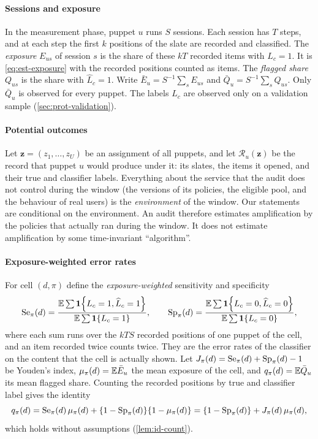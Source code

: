 \paragraph{Sessions and exposure}
In the measurement phase, puppet $u$ runs $S$ sessions. Each session has $T$ steps, and at each step the first $k$ positions of the slate are recorded and classified. The \emph{exposure} $E_{us}$ of session $s$ is the share of these $kT$ recorded items with $L_c=1$. It is \eqref{eq:est-exposure} with the recorded positions counted as items. The \emph{flagged share} $Q_{us}$ is the share with $\widehat L_c=1$. Write $\bar E_u=S^{-1}\sum_sE_{us}$ and $\bar Q_u=S^{-1}\sum_sQ_{us}$. Only $\bar Q_u$ is observed for every puppet. The labels $L_c$ are observed only on a validation sample (\cref{sec:prot-validation}).

\paragraph{Potential outcomes}
Let $\bm z=(z_1,\dots,z_U)$ be an assignment of all puppets, and let $\mathcal R_u(\bm z)$ be the record that puppet $u$ would produce under it: its slates, the items it opened, and their true and classifier labels. Everything about the service that the audit does not control during the window (the versions of its policies, the eligible pool, and the behaviour of real users) is the \emph{environment} of the window. Our statements are conditional on the environment. An audit therefore estimates amplification by the policies that actually ran during the window. It does not estimate amplification by some time-invariant ``algorithm''.

\paragraph{Exposure-weighted error rates}
For cell $(d,\pi)$ define the \emph{exposure-weighted} sensitivity and specificity
\begin{equation}\label{eq:id-sesp}
  \mathrm{Se}_\pi(d)=\frac{\mathbb{E}\sum\mathbf{1}\!\left\{L_c=1,\widehat L_c=1\right\}}{\mathbb{E}\sum\mathbf{1}\!\left\{L_c=1\right\}},\qquad
  \mathrm{Sp}_\pi(d)=\frac{\mathbb{E}\sum\mathbf{1}\!\left\{L_c=0,\widehat L_c=0\right\}}{\mathbb{E}\sum\mathbf{1}\!\left\{L_c=0\right\}},
\end{equation}
where each sum runs over the $kTS$ recorded positions of one puppet of the cell, and an item recorded twice counts twice. They are the error rates of the classifier on the content that the cell is actually shown. Let $J_\pi(d)=\mathrm{Se}_\pi(d)+\mathrm{Sp}_\pi(d)-1$ be Youden's index, $\mu_\pi(d)=\mathbb{E}\bar E_u$ the mean exposure of the cell, and $q_\pi(d)=\mathbb{E}\bar Q_u$ its mean flagged share. Counting the recorded positions by true and classifier label gives the identity
\begin{equation}\label{eq:id-q}
  q_\pi(d)=\mathrm{Se}_\pi(d)\,\mu_\pi(d)+\{1-\mathrm{Sp}_\pi(d)\}\{1-\mu_\pi(d)\}=\{1-\mathrm{Sp}_\pi(d)\}+J_\pi(d)\,\mu_\pi(d),
\end{equation}
which holds without assumptions (\cref{lem:id-count}).

